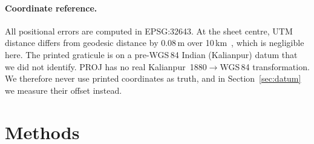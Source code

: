 \documentclass[10pt,twocolumn]{article}
\newcommand{\metre}{\,m}
\begin{document}
\paragraph{Coordinate reference.}
All positional errors are computed in EPSG:32643. At the sheet centre, UTM distance differs from geodesic distance by 0.08\metre{} over 10\,km~\citep{snyder1987projections}, which is negligible here. The printed graticule is on a pre-WGS\,84 Indian (Kalianpur) datum that we did not identify. PROJ has no real Kalianpur~1880$\to$WGS\,84 transformation. We therefore never use printed coordinates as truth, and in Section~\ref{sec:datum} we measure their offset instead.

\section{Methods}
\end{document}
